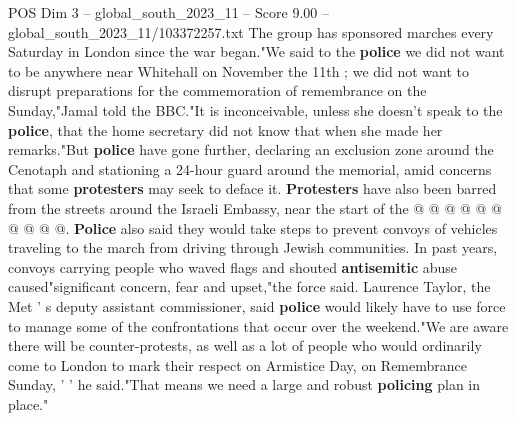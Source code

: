 \begin{textsample}{POS Dim 3 – global\_south\_2023\_11 – Score 9.00 – global\_south\_2023\_11/103372257.txt}
The group has sponsored marches every Saturday in London since the war began."We said to the \textbf{police} we did not want to be anywhere near Whitehall on November the 11th ; we did not want to disrupt preparations for the commemoration of remembrance on the Sunday,"Jamal told the BBC."It is inconceivable, unless she doesn't speak to the \textbf{police}, that the home secretary did not know that when she made her remarks."But \textbf{police} have gone further, declaring an exclusion zone around the Cenotaph and stationing a 24-hour guard around the memorial, amid concerns that some \textbf{protesters} may seek to deface it. \textbf{Protesters} have also been barred from the streets around the Israeli Embassy, near the start of the @ @ @ @ @ @ @ @ @ @. \textbf{Police} also said they would take steps to prevent convoys of vehicles traveling to the march from driving through Jewish communities.
In past years, convoys carrying people who waved flags and shouted \textbf{antisemitic} abuse caused"significant concern, fear and upset,"the force said.
Laurence Taylor, the Met ' s deputy assistant commissioner, said \textbf{police} would likely have to use force to manage some of the confrontations that occur over the weekend."We are aware there will be counter-protests, as well as a lot of people who would ordinarily come to London to mark their respect on Armistice Day, on Remembrance Sunday, ' ' he said."That means we need a large and robust \textbf{policing} plan in place."

\end{textsample}

